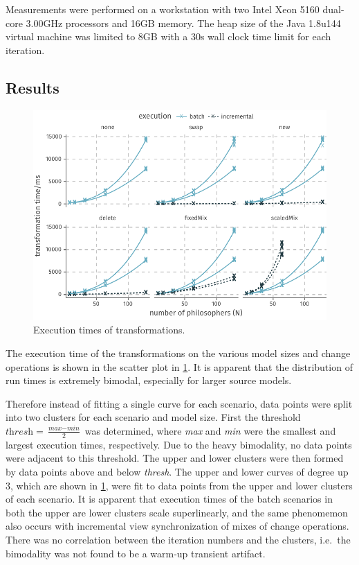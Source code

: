 Measurements were performed on a workstation with two Intel Xeon 5160 dual-core 3.00\thinspace GHz processors and 16\thinspace GB memory. The heap size of the Java 1.8u144 virtual machine was limited to 8\thinspace GB with a 30\thinspace s wall clock time limit for each iteration.

\subsection{Results}

\begin{figure}
  \centering
  \includegraphics{figures/plot_execution}
  \caption{Execution times of transformations.}
  \label{fig:apply:plot-execution}
\end{figure}

The execution time of the transformations on the various model sizes and change operations is shown in the scatter plot in \cref{fig:apply:plot-execution}. It is apparent that the distribution of run times is extremely bimodal, especially for larger source models.

Therefore instead of fitting a single curve for each scenario, data points were split into two clusters for each scenario and model size. First the threshold \(\textit{thresh} = \frac{\textit{max} - \textit{min}}{2}\) was determined, where \textit{max} and \textit{min} were the smallest and largest execution times, respectively. Due to the heavy bimodality, no data points were adjacent to this threshold. The upper and lower clusters were then formed by data points above and below \textit{thresh}. The upper and lower curves of degree up \(3\), which are shown in \cref{fig:apply:plot-execution}, were fit to data points from the upper and lower clusters of each scenario. It is apparent that execution times of the batch scenarios in both the upper are lower clusters scale superlinearly, and the same phenomemon also occurs with incremental view synchronization of mixes of change operations. There was no correlation between the iteration numbers and the clusters, i.e.~the bimodality was not found to be a warm-up transient artifact.

